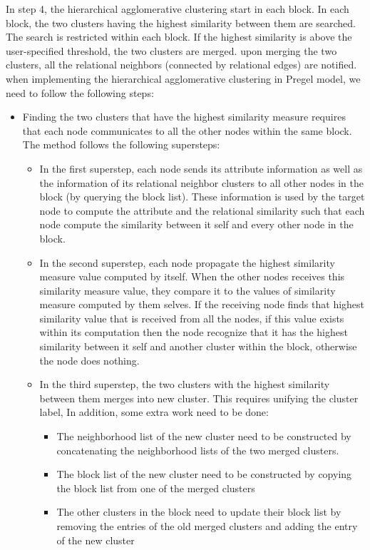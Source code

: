In step 4, the hierarchical agglomerative clustering start in each block. In each block, the two clusters having the highest similarity between them are searched. The search is restricted within each block. If the highest similarity is above the user-specified threshold, the two clusters are merged. upon merging the two clusters, all the relational neighbors (connected by relational edges) are notified. when implementing the hierarchical agglomerative clustering in Pregel model, we need to follow the following steps:
\begin{itemize}
\item Finding the two clusters that have the highest similarity measure requires that each node communicates to all the other nodes within the same block. The method follows the following supersteps:
\begin{itemize}
\item In the first superstep, each node sends its attribute information as well as the information of its relational neighbor clusters to all other nodes in the block (by querying the block list). These information is used by the target node to compute the attribute and the relational similarity such that each node compute the similarity between it self and every other node in the block.
\item In the second superstep, each node propagate the highest similarity measure value computed by itself. When the other nodes receives this similarity measure value, they compare it to the values of similarity measure computed by them selves. If the receiving node finds that highest similarity value that is received from all the nodes, if this value exists within its computation then the node recognize that it has the highest similarity between it self and another cluster within the block, otherwise the node does nothing.
\item In the third superstep, the two clusters with the highest similarity between them merges into new cluster. This requires unifying the cluster label, In addition, some extra work need to be done: 
\begin{itemize}
\item The neighborhood list of the new cluster need to be constructed by concatenating the neighborhood lists of the two merged clusters.

\item The block list of the new cluster need to be constructed by copying the block list from one of the merged clusters

\item The other clusters in the block need to update their block list by removing the entries of the old merged clusters and adding the entry of the new cluster


\end{itemize}
\end{itemize}
\end{itemize}
